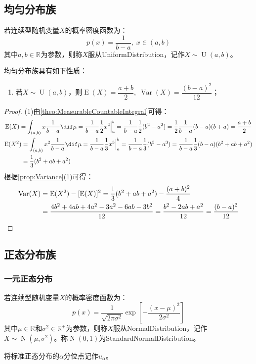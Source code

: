 \subsection{均匀分布族}
\begin{definition}
	若连续型随机变量$X$的概率密度函数为：
	\begin{equation*}
		p(x)=\frac{1}{b-a},\;x\in(a,b)
	\end{equation*}
	其中$a,b\in\mathbb{R}^{}$为参数，则称$X$服从\gls{UniformDistribution}，记作$X\sim\operatorname{U}(a,b)$。
\end{definition}
\begin{property}
	均匀分布族具有如下性质：
	\begin{enumerate}
		\item 若$X\sim\operatorname{U}(a,b)$，则$\operatorname{E}(X)=\dfrac{a+b}{2},\;\operatorname{Var}(X)=\dfrac{(b-a)^2}{12}$；
	\end{enumerate}
\end{property}
\begin{proof}
	(1)由\cref{theo:MeasurableCountableIntegral}可得：
	\begin{gather*}
		\operatorname{E}(X)=\int_{(a,b)}x\frac{1}{b-a}\dif\mu=\frac{1}{b-a}\frac{1}{2}x^2\Big|_a^b=\frac{1}{b-a}\frac{1}{2}(b^2-a^2)=\frac{1}{2}\frac{1}{b-a}(b-a)(b+a)=\frac{a+b}{2} \\
		\begin{aligned}
			\operatorname{E}(X^2)&=\int_{(a,b)}x^2\frac{1}{b-a}\dif\mu=\frac{1}{b-a}\frac{1}{3}x^3\Big|_a^b=\frac{1}{b-a}\frac{1}{3}(b^3-a^3)=\frac{1}{b-a}\frac{1}{3}(b-a)(b^2+ab+a^2) \\
			&=\frac{1}{3}(b^2+ab+a^2)
		\end{aligned}
	\end{gather*}
	根据\cref{prop:Variance}(1)可得：
	\begin{align*}
		\operatorname{Var}(X)&=\operatorname{E}(X^2)-[\operatorname{E}(X)]^2=\frac{1}{3}(b^2+ab+a^2)-\frac{(a+b)^2}{4} \\
		&=\frac{4b^2+4ab+4a^2-3a^2-6ab-3b^2}{12}=\frac{b^2-2ab+a^2}{12}=\frac{(b-a)^2}{12}\qedhere
	\end{align*}
\end{proof}

\subsection{正态分布族}
\subsubsection{一元正态分布}
\begin{definition}
	若连续型随机变量$X$的概率密度函数为：
	\begin{equation*}
		p(x)=\frac{1}{\sqrt{2\pi\sigma^2}}\exp\left[-\frac{(x-\mu)^2}{2\sigma^2}\right]
	\end{equation*}
	其中$\mu\in\mathbb{R}^{}$和$\sigma^2\in\mathbb{R}^{+}$为参数，则称$X$服从\gls{NormalDistribution}，记作$X\sim\operatorname{N}(\mu,\sigma^2)$。称$\operatorname{N}(0,1)$为\gls{StandardNormalDistribution}。
\end{definition}
\begin{note}
	将标准正态分布的$\alpha$分位点记作$u_{\alpha}$。
\end{note}

